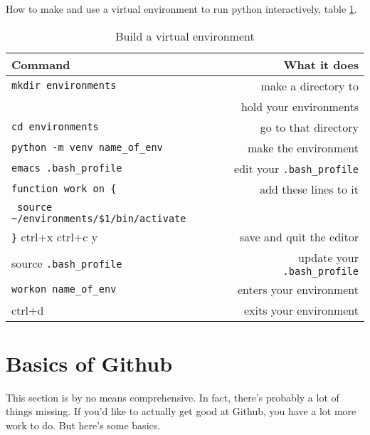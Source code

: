 \documentclass{article}
\begin{document}

How to make and use a virtual environment to run python interactively, table \ref{venv}.

\begin{table}
        \begin{center}
                \caption{Build a virtual environment}
                \label{venv}
                \begin{tabular}{l|r}
                  \textbf{Command} & \textbf{What it does}\\
                  \hline
                  \verb|mkdir environments| & make a directory to \\
                                   & hold your environments \\
                  \verb|cd environments| & go to that directory \\
                  \verb|python -m venv name_of_env| & make the
                                                      environment \\
                  \verb|emacs .bash_profile| & edit your
                                               \verb|.bash_profile|\\
                  \verb|function work on {| & add these lines to it \\
                  \verb| source ~/environments/$1/bin/activate| & \\
                  \verb|}|
                  ctrl+x ctrl+c y & save and quit the editor \\
                  source \verb|.bash_profile| & update your
                                                \verb|.bash_profile|\\
                  \verb|workon name_of_env| & enters your environment
                  \\
                  ctrl+d & exits your environment \\
                \end{tabular}
        \end{center}
\end{table}

\section{Basics of Github}

This section is by no means comprehensive. In fact, there's probably a
lot of things missing. If you'd like to actually get good at Github,
you have a lot more work to do. But here's some basics.
\end{document}
